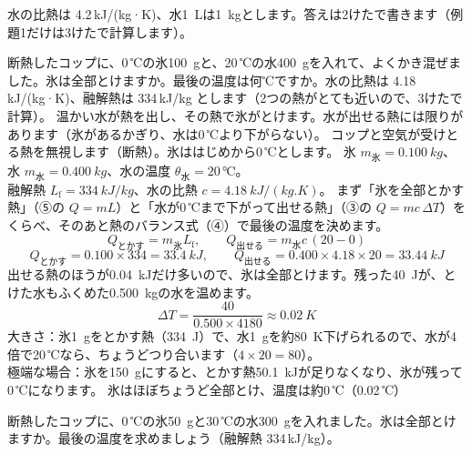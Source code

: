 \noindent 水の比熱は 4.2\,kJ/(kg·K)、水\qty{1}{L}は\qty{1}{kg}とします。答えは2けたで書きます（例題1だけは3けたで計算します）。

\label{ph:熱-1:ex1}
\begin{phreidai}
断熱したコップに、0\,℃の氷\qty{100}{g}と、20\,℃の水\qty{400}{g}を入れて、よくかき混ぜました。氷は全部とけますか。最後の温度は何℃ですか。水の比熱は 4.18\,kJ/(kg·K)、融解熱は 334\,kJ/kg とします（2つの熱がとても近いので、3けたで計算）。
\phbamen
温かい水が熱を出し、その熱で氷がとけます。水が出せる熱には限りがあります（氷があるかぎり、水は0\,℃より下がらない）。
\phmushi
コップと空気が受けとる熱を無視します（断熱）。氷ははじめから0\,℃とします。
\phzu
氷 $m_{\text{氷}}=\qty{0.100}{kg}$、水 $m_{\text{水}}=\qty{0.400}{kg}$、水の温度 $\theta_{\text{水}}=20\,℃$。\\
融解熱 $L_{\mathrm f}=\qty{334}{kJ/kg}$、水の比熱 $c=\qty{4.18}{kJ/(kg.K)}$。
\phriyu
まず「氷を全部とかす熱」（⑤の $Q=mL$）と「水が0\,℃まで下がって出せる熱」（③の $Q=mc\,\Delta T$）をくらべ、そのあと熱のバランス式（④）で最後の温度を決めます。
\phtateru
\[Q_{\text{とかす}}=m_{\text{氷}}L_{\mathrm f},\qquad Q_{\text{出せる}}=m_{\text{水}}c\,(20-0)\]
\phtoku
\[Q_{\text{とかす}}=0.100\times334=\qty{33.4}{kJ},\qquad Q_{\text{出せる}}=0.400\times4.18\times20=\qty{33.44}{kJ}\]
出せる熱のほうが\qty{0.04}{kJ}だけ多いので、氷は全部とけます。残った\qty{40}{J}が、とけた水もふくめた\qty{0.500}{kg}の水を温めます。
\[\Delta T=\frac{40}{0.500\times4180}\approx\qty{0.02}{K}\]
\phtashikame
大きさ：氷\qty{1}{g}をとかす熱（\qty{334}{J}）で、水\qty{1}{g}を約\qty{80}{K}下げられるので、水が4倍で20\,℃なら、ちょうどつり合います（$4\times20=80$）。\\
極端な場合：氷を\qty{150}{g}にすると、とかす熱\qty{50.1}{kJ}が足りなくなり、氷が残って0\,℃になります。
\kotae 氷はほぼちょうど全部とけ、温度は約0\,℃（0.02\,℃）
\end{phreidai}
\begin{jibun}
断熱したコップに、0\,℃の氷\qty{50}{g}と30\,℃の水\qty{300}{g}を入れました。氷は全部とけますか。最後の温度を求めましょう（融解熱 334\,kJ/kg）。
\end{jibun}

